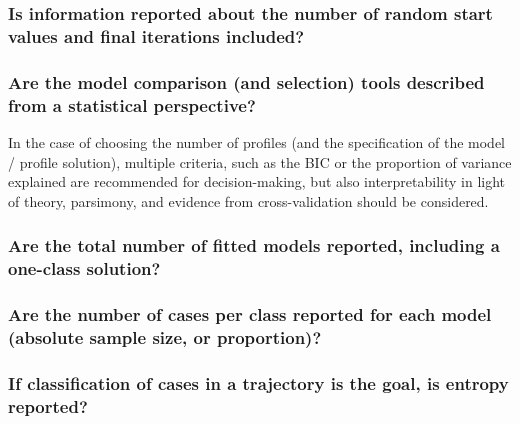 \documentclass[man]{apa6}
\begin{document}
\hypertarget{is-information-reported-about-the-number-of-random-start-values-and-final-iterations-included}{%
\subsubsection{Is information reported about the number of random start values and final iterations included?}\label{is-information-reported-about-the-number-of-random-start-values-and-final-iterations-included}}

\hypertarget{are-the-model-comparison-and-selection-tools-described-from-a-statistical-perspective}{%
\subsubsection{Are the model comparison (and selection) tools described from a statistical perspective?}\label{are-the-model-comparison-and-selection-tools-described-from-a-statistical-perspective}}

In the case of choosing the number of profiles (and the specification of the
model / profile solution), multiple criteria, such as the BIC or the proportion
of variance explained are recommended for decision-making, but also
interpretability in light of theory, parsimony, and evidence from
cross-validation should be considered.

\hypertarget{are-the-total-number-of-fitted-models-reported-including-a-one-class-solution}{%
\subsubsection{Are the total number of fitted models reported, including a one-class solution?}\label{are-the-total-number-of-fitted-models-reported-including-a-one-class-solution}}

\hypertarget{are-the-number-of-cases-per-class-reported-for-each-model-absolute-sample-size-or-proportion}{%
\subsubsection{Are the number of cases per class reported for each model (absolute sample size, or proportion)?}\label{are-the-number-of-cases-per-class-reported-for-each-model-absolute-sample-size-or-proportion}}

\hypertarget{if-classification-of-cases-in-a-trajectory-is-the-goal-is-entropy-reported}{%
\subsubsection{If classification of cases in a trajectory is the goal, is entropy reported?}\label{if-classification-of-cases-in-a-trajectory-is-the-goal-is-entropy-reported}}
\end{document}
